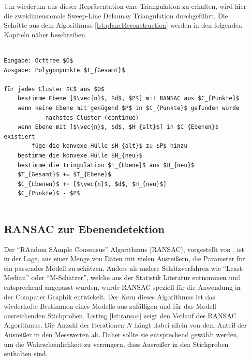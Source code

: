 Um wiederum aus dieser Repräsentation eine Triangulation zu erhalten, wird hier die zweidimensionale Sweep-Line Delaunay Triangulation durchgeführt. Die Schritte aus dem Algorithmus \ref{lst:planeReconstruction} werden in den folgenden Kapiteln näher beschreiben.

\begin{lstlisting}[mathescape,caption=Algorthmus der planaren Echtzeit Rekonstruktion, label=lst:planeReconstruction]

Eingabe: Octtree $O$
Ausgabe: Polygonpunkte $T_{Gesamt}$

für jedes Cluster $C$ aus $O$
    bestimme Ebene [$\vec{n}$, $d$, $P$] mit RANSAC aus $C_{Punkte}$
    wenn keine Ebene mit genügend $P$ in $C_{Punkte}$ gefunden wurde
    		nächstes Cluster (continue)
    wenn Ebene mit [$\vec{n}$, $d$, $H_{alt}$] in $C_{Ebenen}$ existiert	
        füge die konvexe Hülle $H_{alt}$ zu $P$ hinzu	
    bestimme die konvexe Hülle $H_{neu}$
    bestimme die Tringulation $T_{Ebene}$ aus $H_{neu}$
    $T_{Gesamt}$ += $T_{Ebene}$
    $C_{Ebenen}$ += [$\vec{n}$, $d$, $H_{neu}$]
    $C_{Punkte}$ - $P$
		

\end{lstlisting}

\subsection{RANSAC zur Ebenendetektion}

Der \enquote{RAndom SAmple Consensus} Algorithmus (RANSAC), vorgestellt von \citet{fischler1981random}, ist in der Lage, aus einer Menge von Daten mit vielen Ausreißern, die Parameter für ein passendes Modell zu schätzen. Anders als andere Schätzverfahren wie \enquote{Least-Median} oder \enquote{M-Schätzer}, welche aus der Statistik Literatur entnommen und entsprechend angepasst wurden, wurde RANSAC speziell für die Anwendung in der Computer Graphik entwickelt. Der Kern dieses Algorithmus ist das wiederholte Bestimmen eines Modells aus zufälligen und für das Modell ausreichenden Stichproben. Listing \ref{lst:ransac} zeigt den Verlauf des RANSAC Algorithmus. Die Anzahl der Iterationen \(N\) hängt dabei allein von dem Anteil der Ausreißer in den Messwerten ab. Daher sollte sie entsprechend gewählt werden, um die Wahrscheinlichkeit zu verringern, dass Ausreißer in den Stichproben enthalten sind. \citep{derpanis2010overview} \\

